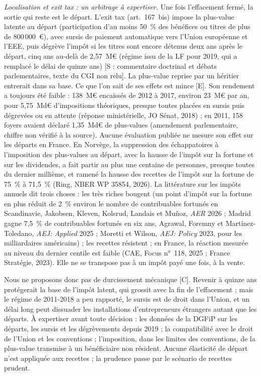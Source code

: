 \emph{Localisation et exit tax : un arbitrage à expertiser.} Une fois l'effacement fermé, la sortie qui reste est le
départ. L'exit tax (art.~167~bis) impose la plus-value latente au départ (participation d'au moins 50~\% des bénéfices
ou titres de plus de 800\,000~€), avec sursis de paiement automatique vers l'Union européenne et l'EEE, puis dégrève
l'impôt si les titres sont encore détenus deux ans après le départ, cinq ans au-delà de 2,57~M€ (régime issu de la
LF pour 2019, qui a remplacé le délai de quinze ans) [S : commentaire doctrinal et débats parlementaires, texte du CGI
non relu]. La plus-value reprise par un héritier entrerait dans sa base. Ce que l'on sait de ses effets est mince [E].
Son rendement a toujours été faible : 138~M€ encaissés de 2012 à 2017, environ 23~M€ par an, pour 5,75~Md€
d'impositions théoriques, presque toutes placées en sursis puis dégrevées ou en attente (réponse ministérielle, JO
Sénat, 2018) ; en 2011, 158 foyers avaient déclaré 1,35~Md€ de plus-values (amendement parlementaire, chiffre non
vérifié à la source). Aucune évaluation publiée ne mesure son effet sur les départs en France. En Norvège, la
suppression des échappatoires à l'imposition des plus-values au départ, avec la hausse de l'impôt sur la fortune et
sur les dividendes, a fait partir au plus une centaine de personnes, presque toutes du dernier millième, et ramené la
hausse des recettes de l'impôt sur la fortune de 75~\% à 71,5~\% (Ring, NBER WP 35854, 2026). La littérature sur les
impôts annuels dit trois choses : les très riches bougent (un point d'impôt sur la fortune en plus réduit de 2~\% environ
le nombre de contribuables fortunés en Scandinavie, Jakobsen, Kleven, Kolsrud, Landais et Muñoz, \emph{AER} 2026 ;
Madrid gagne 7,5~\% de contribuables fortunés en six ans, Agrawal, Foremny et Martínez-Toledano, \emph{AEJ: Applied}
2025 ; Moretti et Wilson, \emph{AEJ: Policy} 2023, pour les milliardaires américains) ; les recettes résistent ; en
France, la réaction mesurée au niveau du dernier centile est faible (CAE, Focus n°~118, 2025 ; France Stratégie, 2023).
Elle ne se transpose pas à un impôt payé une fois, à la vente.

Nous ne proposons donc pas de durcissement mécanique [C]. Revenir à quinze ans protégerait la base de l'impôt latent,
qui grossit avec la fin de l'effacement ; mais le régime de 2011-2018 a peu rapporté, le sursis est de droit dans
l'Union, et un délai long peut dissuader les installations d'entrepreneurs étrangers autant que les départs. À
expertiser avant toute décision : les données de la DGFiP sur les départs, les sursis et les dégrèvements depuis 2019 ;
la compatibilité avec le droit de l'Union et les conventions ; l'imposition, dans les limites des conventions, de la
plus-value transmise à un bénéficiaire non résident. Aucune élasticité de départ n'est appliquée aux recettes ; la
prudence passe par le scénario de recettes prudent.


